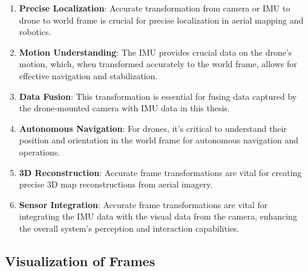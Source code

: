 \begin{enumerate}
    \item \textbf{Precise Localization}: Accurate transformation from camera or IMU to drone to world frame is crucial for precise localization in aerial mapping and robotics.
    \item \textbf{Motion Understanding}: The IMU provides crucial data on the drone's motion, which, when transformed accurately to the world frame, allows for effective navigation and stabilization.
    \item \textbf{Data Fusion}: This transformation is essential for fusing data captured by the drone-mounted camera with IMU data in this thesis.
    \item \textbf{Autonomous Navigation}: For drones, it's critical to understand their position and orientation in the world frame for autonomous navigation and operations.
    \item \textbf{3D Reconstruction}: Accurate frame transformations are vital for creating precise 3D map reconstructions from aerial imagery.
    \item \textbf{Sensor Integration}: Accurate frame transformations are vital for integrating the IMU data with the visual data from the camera, enhancing the overall system's perception and interaction capabilities.
\end{enumerate}    
\subsection{Visualization of Frames}
\clearpage
